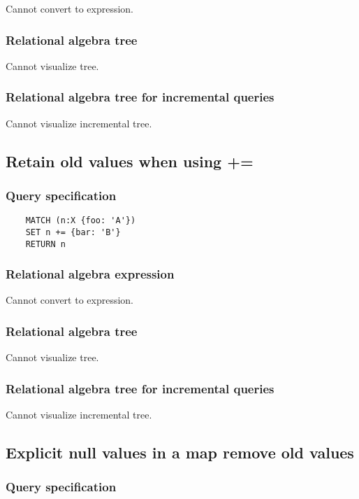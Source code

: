 	Cannot convert to expression.

	\subsubsection*{Relational algebra tree}

	Cannot visualize tree.

	\subsubsection*{Relational algebra tree for incremental queries}

	Cannot visualize incremental tree.
	\subsection{Retain old values when using +=}

	\subsubsection*{Query specification}

	\begin{lstlisting}
	MATCH (n:X {foo: 'A'})
	SET n += {bar: 'B'}
	RETURN n
	\end{lstlisting}


	\subsubsection*{Relational algebra expression}

	Cannot convert to expression.

	\subsubsection*{Relational algebra tree}

	Cannot visualize tree.

	\subsubsection*{Relational algebra tree for incremental queries}

	Cannot visualize incremental tree.
	\subsection{Explicit null values in a map remove old values}

	\subsubsection*{Query specification}

